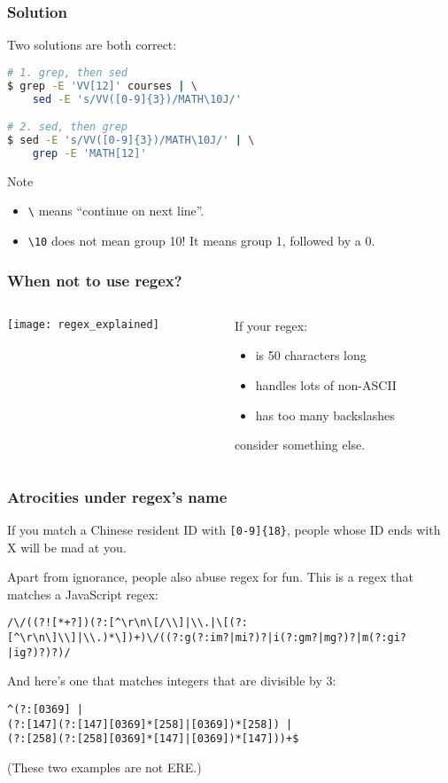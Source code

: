 \begin{frame}[fragile]
\frametitle{Solution}
Two solutions are both correct:
\begin{lstlisting}[language=bash]
# 1. grep, then sed
$ grep -E 'VV[12]' courses | \
    sed -E 's/VV([0-9]{3})/MATH\10J/'

# 2. sed, then grep
$ sed -E 's/VV([0-9]{3})/MATH\10J/' | \
    grep -E 'MATH[12]'
\end{lstlisting}
\begin{block}{Note}
    \begin{itemize}
        \item \verb|\| means ``continue on next line''.
        \item \verb|\10| does not mean group 10! It means group 1, followed by
            a 0.
    \end{itemize}
\end{block}
\end{frame}

\begin{frame}
\frametitle{When not to use regex?}
\begin{columns}
    \begin{column}{0.7\textwidth}
        \texttt{[image: regex\_explained]}
    \end{column}
    \begin{column}{0.3\textwidth}
        If your regex:
        \begin{itemize}
            \item is 50 characters long
            \item handles lots of non-ASCII
            \item has too many backslashes
        \end{itemize}
        consider something else.
    \end{column}
\end{columns}
\end{frame}

\begin{frame}[fragile]
\frametitle{Atrocities under regex's name}
If you match a Chinese resident ID with \verb|[0-9]{18}|, people whose
ID ends with X will be mad at you.
\bigskip

Apart from ignorance, people also abuse regex for fun. This is a regex
that matches a JavaScript regex:
\begin{lstlisting}
/\/((?![*+?])(?:[^\r\n\[/\\]|\\.|\[(?:[^\r\n\]\\]|\\.)*\])+)\/((?:g(?:im?|mi?)?|i(?:gm?|mg?)?|m(?:gi?|ig?)?)?)/
\end{lstlisting}

And here's one that matches integers that are divisible by 3:
\begin{lstlisting}
^(?:[0369] |
(?:[147](?:[147][0369]*[258]|[0369])*[258]) |
(?:[258](?:[258][0369]*[147]|[0369])*[147]))+$
\end{lstlisting}

(These two examples are not ERE.)
\end{frame}

